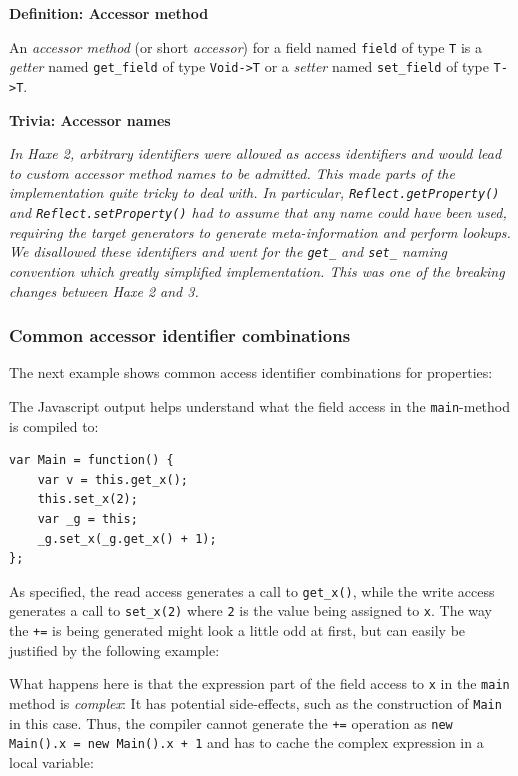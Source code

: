 \documentclass{article}
\newcommand{\target}[1]{#1}
\newcommand{\type}[1]{\texttt{#1}}
\newcommand{\expr}[1]{\texttt{#1}}
\newenvironment{myshaded}
  {\def\FrameCommand{\fboxsep=\topsep\colorbox{bgcolor}}%
  \MakeFramed {\advance\hsize-\width \FrameRestore}}%
 {\endMakeFramed}
\newcommand{\define}[3][Definition]
	{\begin{myshaded}\noindent\textbf{#1: #2}\par\nobreak\noindent\ignorespaces#3\label{def:#2}\end{myshaded}}
\newcommand{\trivia}[2]
	{\begin{myshaded}\noindent\textbf{Trivia: #1}\par\nobreak\noindent\ignorespaces\textit{#2}\end{myshaded}}
\newcommand{\haxe}[2][]{%
}
\begin{document}
\define{Accessor method}{An \emph{accessor method} (or short \emph{accessor}) for a field named \expr{field} of type \type{T} is a \emph{getter} named \expr{get_field} of type \type{Void->T} or a \emph{setter} named \expr{set_field} of type \type{T->T}.}

\trivia{Accessor names}{In Haxe 2, arbitrary identifiers were allowed as access identifiers and would lead to custom accessor method names to be admitted. This made parts of the implementation quite tricky to deal with. In particular, \expr{Reflect.getProperty()} and \expr{Reflect.setProperty()} had to assume that any name could have been used, requiring the target generators to generate meta-information and perform lookups.\\
We disallowed these identifiers and went for the \expr{get_} and \expr{set_} naming convention which greatly simplified implementation. This was one of the breaking changes between Haxe 2 and 3.}

\subsubsection{Common accessor identifier combinations}

The next example shows common access identifier combinations for properties:

\haxe{assets/Property2.hx}

The \target{Javascript} output helps understand what the field access in the \expr{main}-method is compiled to:

\begin{lstlisting}
var Main = function() {
	var v = this.get_x();
	this.set_x(2);
	var _g = this;
	_g.set_x(_g.get_x() + 1);
};
\end{lstlisting}

As specified, the read access generates a call to \expr{get_x()}, while the write access generates a call to \expr{set_x(2)} where \expr{2} is the value being assigned to \expr{x}. The way the \expr{+=} is being generated might look a little odd at first, but can easily be justified by the following example:

\haxe{assets/Property3.hx}

What happens here is that the expression part of the field access to \expr{x} in the \expr{main} method is \emph{complex}: It has potential side-effects, such as the construction of \type{Main} in this case. Thus, the compiler cannot generate the \expr{+=} operation as \expr{new Main().x = new Main().x + 1} and has to cache the complex expression in a local variable:
\end{document}
